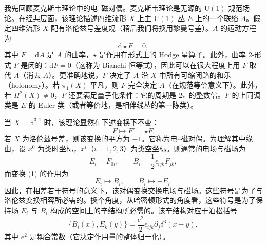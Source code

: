 \documentclass[11pt,a4paper,UTF8]{ctexart}
\begin{document}
我先回顾麦克斯韦理论中的电–磁对偶。麦克斯韦理论是无源的 $\mathrm{U}(1)$ 规范场论。在经典层面，该理论描述四维流形 $X$ 上主 $\mathrm{U}(1)$ 丛 $E$ 上的一个联络 $A$。假定四维流形 $X$ 配有洛伦兹号差度规（稍后我们将换用黎曼号差）。$A$ 的运动方程为
\[
    \mathrm{d}\star F = 0,
\]
其中 $F=\mathrm{d}A$ 是 $A$ 的曲率，$\star$ 是作用在形式上的 Hodge 星算子。此外，曲率 2-形式 $F$ 是闭的：$\mathrm{d}F=0$（这称为 Bianchi 恒等式），因此可以在很大程度上用 $F$ 取代 $A$（消去 $A$）。更准确地说，$F$ 决定了 $A$ 沿 $X$ 中所有可缩闭路的和乐（holonomy）。若 $\pi_{1}(X)$ 平凡，则 $F$ 完全决定 $A$（在规范等价意义下）。此外，若 $H^{2}(X)\neq 0$，$F$ 还要满足量子化条件：它的周期是 $2\pi$ 的整数倍。$F$ 的上同调类是 $E$ 的 Euler 类（或者等价地，是相伴线丛的第一陈类）。


当 $X=\mathbb{R}^{3,1}$ 时，该理论显然在下述变换下不变：
\begin{equation}
    F \mapsto F' = \star F. \tag{1}
\end{equation}
若 $X$ 为洛伦兹号差，则该变换的平方为 $-1$。它称为电–磁对偶。为理解其中缘由，设 $x^{0}$ 为类时坐标，$x^{i}$（$i=1,2,3$）为类空坐标。则通常的电场与磁场为
\[
    E_{i}=F_{0i},\qquad B_{i}=\frac{1}{2}\epsilon_{ijk}F_{jk},
\]
而变换 (1) 的作用为
\[
    E_{i}\mapsto B_{i},\qquad B_{i}\mapsto -E_{i}.
\]
因此，在相差若干符号的意义下，该对偶变换交换电场与磁场。这些符号是为了与洛伦兹变换相容所必需的。换个角度，从哈密顿形式的角度看，这些符号是为了保持场 $E_{i}$ 与 $B_{i}$ 构成的空间上的辛结构所必需的。该辛结构对应于泊松括号
\[
    \{B_{i}(x),E_{k}(y)\}=\frac{e^{2}}{2}\epsilon_{ijk}\partial_{j}\delta^{3}(x-y),
\]
其中 $e^{2}$ 是耦合常数（它决定作用量的整体归一化）。

\end{document}
